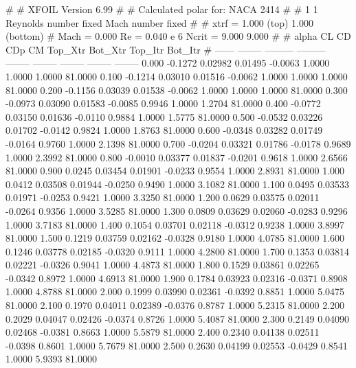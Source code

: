 #  
#       XFOIL         Version 6.99
#  
# Calculated polar for: NACA 2414                                       
#  
# 1 1 Reynolds number fixed          Mach number fixed         
#  
# xtrf =   1.000 (top)        1.000 (bottom)  
# Mach =   0.000     Re =     0.040 e 6     Ncrit =   9.000  9.000
#  
#   alpha    CL        CD       CDp       CM     Top_Xtr  Bot_Xtr  Top_Itr  Bot_Itr
#  ------ -------- --------- --------- -------- -------- -------- -------- --------
   0.000  -0.1272   0.02982   0.01495  -0.0063   1.0000   1.0000   1.0000  81.0000
   0.100  -0.1214   0.03010   0.01516  -0.0062   1.0000   1.0000   1.0000  81.0000
   0.200  -0.1156   0.03039   0.01538  -0.0062   1.0000   1.0000   1.0000  81.0000
   0.300  -0.0973   0.03090   0.01583  -0.0085   0.9946   1.0000   1.2704  81.0000
   0.400  -0.0772   0.03150   0.01636  -0.0110   0.9884   1.0000   1.5775  81.0000
   0.500  -0.0532   0.03226   0.01702  -0.0142   0.9824   1.0000   1.8763  81.0000
   0.600  -0.0348   0.03282   0.01749  -0.0164   0.9760   1.0000   2.1398  81.0000
   0.700  -0.0204   0.03321   0.01786  -0.0178   0.9689   1.0000   2.3992  81.0000
   0.800  -0.0010   0.03377   0.01837  -0.0201   0.9618   1.0000   2.6566  81.0000
   0.900   0.0245   0.03454   0.01901  -0.0233   0.9554   1.0000   2.8931  81.0000
   1.000   0.0412   0.03508   0.01944  -0.0250   0.9490   1.0000   3.1082  81.0000
   1.100   0.0495   0.03533   0.01971  -0.0253   0.9421   1.0000   3.3250  81.0000
   1.200   0.0629   0.03575   0.02011  -0.0264   0.9356   1.0000   3.5285  81.0000
   1.300   0.0809   0.03629   0.02060  -0.0283   0.9296   1.0000   3.7183  81.0000
   1.400   0.1054   0.03701   0.02118  -0.0312   0.9238   1.0000   3.8997  81.0000
   1.500   0.1219   0.03759   0.02162  -0.0328   0.9180   1.0000   4.0785  81.0000
   1.600   0.1246   0.03778   0.02185  -0.0320   0.9111   1.0000   4.2800  81.0000
   1.700   0.1353   0.03814   0.02221  -0.0326   0.9041   1.0000   4.4873  81.0000
   1.800   0.1529   0.03861   0.02265  -0.0342   0.8972   1.0000   4.6913  81.0000
   1.900   0.1784   0.03923   0.02316  -0.0371   0.8908   1.0000   4.8788  81.0000
   2.000   0.1999   0.03990   0.02361  -0.0392   0.8851   1.0000   5.0475  81.0000
   2.100   0.1970   0.04011   0.02389  -0.0376   0.8787   1.0000   5.2315  81.0000
   2.200   0.2029   0.04047   0.02426  -0.0374   0.8726   1.0000   5.4087  81.0000
   2.300   0.2149   0.04090   0.02468  -0.0381   0.8663   1.0000   5.5879  81.0000
   2.400   0.2340   0.04138   0.02511  -0.0398   0.8601   1.0000   5.7679  81.0000
   2.500   0.2630   0.04199   0.02553  -0.0429   0.8541   1.0000   5.9393  81.0000
